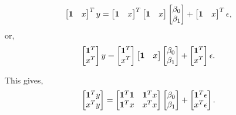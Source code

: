 \documentclass{amsart}
\theoremstyle{plain}
\numberwithin{equation}{section}
\begin{document}
\begin{align*}
\begin{bmatrix}
{\bf 1} & x
\end{bmatrix}^T
y &= 
\begin{bmatrix}
{\bf 1} & x
\end{bmatrix}^T
\begin{bmatrix}
{\bf 1} & x
\end{bmatrix}
\begin{bmatrix}
\beta_0\\
\beta_1
\end{bmatrix} + 
\begin{bmatrix}
{\bf 1} & x
\end{bmatrix}^T\epsilon,
\end{align*}
or,
\begin{align*}
\begin{bmatrix}
{\bf 1}^T\\
x^T
\end{bmatrix}
y &= 
\begin{bmatrix}
{\bf 1}^T\\
x^T
\end{bmatrix}
\begin{bmatrix}
{\bf 1} & x
\end{bmatrix}
\begin{bmatrix}
\beta_0\\
\beta_1
\end{bmatrix} + 
\begin{bmatrix}
{\bf 1}^T\\
x^T
\end{bmatrix}\epsilon.
\end{align*}

This gives,
\begin{align*}
\begin{bmatrix}
{\bf 1}^Ty\\
x^Ty
\end{bmatrix}
&= 
\begin{bmatrix}
{\bf 1}^T{\bf 1} & {\bf 1}^Tx\\
{\bf 1}^Tx & x^Tx
\end{bmatrix}
\begin{bmatrix}
\beta_0\\
\beta_1
\end{bmatrix} + 
\begin{bmatrix}
{\bf 1}^T \epsilon\\
x^T\epsilon
\end{bmatrix}.
\end{align*}
\end{document}
